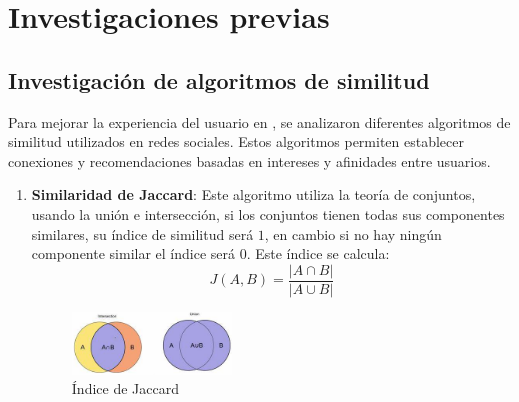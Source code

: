 \section{Investigaciones previas}
\subsection{Investigación de algoritmos de similitud}
Para mejorar la experiencia del usuario en \loopweb, se analizaron diferentes algoritmos de similitud utilizados en redes sociales. Estos algoritmos permiten establecer conexiones y recomendaciones basadas en intereses y afinidades entre usuarios.

\begin{enumerate}
    \item \textbf{Similaridad de Jaccard}: Este algoritmo utiliza la teoría de conjuntos, usando la unión e intersección, si los conjuntos tienen todas sus componentes similares, su índice de similitud será $1$, en cambio si no hay ningún componente similar el índice será $0$. Este índice se calcula: \[J(A,B)=\frac{|A\cap B|}{|A\cup B|}\]
        \begin{figure}[!ht]
            \centering
            \includegraphics[width=0.4\textwidth]{./src/images/Indice de Jaccard.png}
            \caption{Índice de Jaccard}
            \label{fig:indicejaccard}
        \end{figure}


\end{enumerate}
